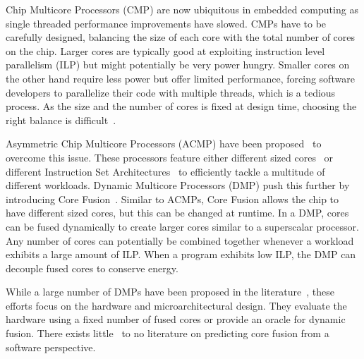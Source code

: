 Chip Multicore Processors (CMP) are now ubiquitous in embedded computing as single threaded performance improvements have slowed.
CMPs have to be carefully designed, balancing the size of each core with the total number of cores on the chip.
Larger cores are typically good at exploiting instruction level parallelism (ILP) but might potentially be very power hungry.
Smaller cores on the other hand require less power but offer limited performance, forcing software developers to parallelize their code with multiple threads, which is a tedious process.
As the size and the number of cores is fixed at design time, choosing the right balance is difficult~\cite{DubachExpl2012, TomuskHet2015}.

Asymmetric Chip Multicore Processors (ACMP) have been proposed~\cite{MittalSurv2016} to overcome this issue.
These processors feature either different sized cores~\cite{JibajaPPerf2016} or different Instruction Set Architectures~\cite{VenkatISADiv2014} to efficiently tackle a multitude of different workloads.
Dynamic Multicore Processors (DMP) push this further by introducing Core Fusion~\cite{ipek2007CoreFusion}.
Similar to ACMPs, Core Fusion allows the chip to have different sized cores, but this can be changed at runtime.
In a DMP, cores can be fused dynamically to create larger cores similar to a superscalar processor.
Any number of cores can potentially be combined together whenever a workload exhibits a large amount of ILP.
When a program exhibits low ILP, the DMP can decouple fused cores to conserve energy.

While a large number of DMPs have been proposed in the literature~\cite{ipek2007CoreFusion,pricopi2012bahurupi,kim2007tflex,Watanabe2010Widget}, these efforts focus on the hardware and microarchitectural design.
They evaluate the hardware using a fixed number of fused cores or provide an oracle for dynamic fusion.
There exists little~\cite{micolet2016dmpstream} to no literature on predicting core fusion from a software perspective.

